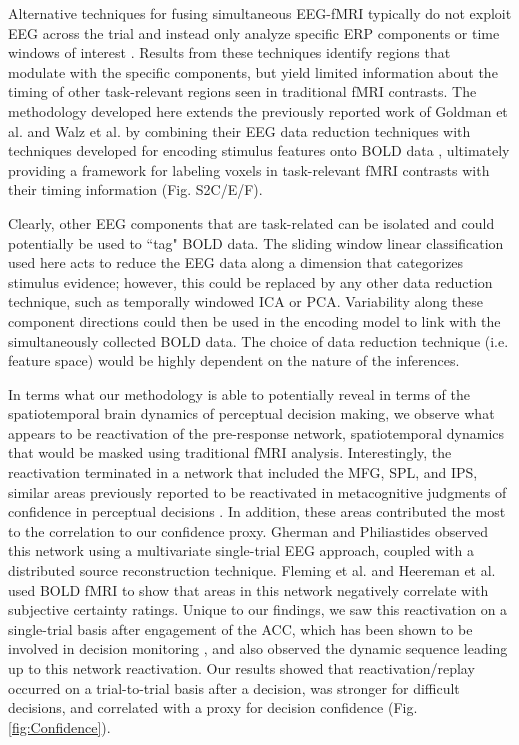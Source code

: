 Alternative techniques for fusing simultaneous EEG-fMRI typically do not exploit EEG across the trial and instead only analyze specific ERP components or time windows of interest \cite{DeMartino2010,Fouragnan2015,Goldman2009,Huster2012,Jann2009,Jaspers-Fayer2012,Mayhew2013,Novitskiy2011,Omata2013,Walz2013,Walz2013a,Warbrick2013a,Warbrick2009}. Results from these techniques identify regions that modulate with the specific components, but yield limited information about the timing of other task-relevant regions seen in traditional fMRI contrasts. The methodology developed here extends the previously reported work of Goldman et al. \cite{Goldman2009} and Walz et al. \cite{Walz2013} by combining their EEG data reduction techniques with techniques developed for encoding stimulus features onto BOLD data \cite{Cukur2013,Hansen2007,Kay2008,Naselaris2011,Nishimoto2011,Stansbury2013}, ultimately providing a framework for labeling voxels in task-relevant fMRI contrasts with their timing information (Fig. S2C/E/F). 

Clearly, other EEG components that are task-related can be isolated and could potentially be used to ``tag" BOLD data. The sliding window linear classification used here acts to reduce the EEG data along a dimension that categorizes stimulus evidence; however, this could be replaced by any other data reduction technique, such as temporally windowed ICA or PCA. Variability along these component directions could then be used in the encoding model to link with the simultaneously collected BOLD data. The choice of data reduction technique (i.e. feature space) would be highly dependent on the nature of the inferences.

In terms what our methodology is able to potentially reveal in terms of the spatiotemporal brain dynamics of perceptual decision making, we observe what appears to be reactivation of the pre-response network, spatiotemporal dynamics that would be masked using traditional fMRI analysis. Interestingly, the reactivation terminated in a network that included the MFG, SPL, and IPS, similar areas previously reported to be reactivated in metacognitive judgments of confidence in perceptual decisions \cite{Fleming2012,Steinhauser2010,Yeung2012}. In addition, these areas contributed the most to the correlation to our confidence proxy. Gherman and Philiastides \cite{Gherman2015} observed this network using a multivariate single-trial EEG approach, coupled with a distributed source reconstruction technique. Fleming et al.\cite{Fleming2012} and Heereman et al. \cite{Heereman2015} used BOLD fMRI to show that areas in this network negatively correlate with subjective certainty ratings.  Unique to our findings, we saw this reactivation on a single-trial basis after engagement of the ACC, which has been shown to be involved in decision monitoring \cite{Botvinick2001,Gherman2015}, and also observed the dynamic sequence leading up to this network reactivation. Our results showed that reactivation/replay occurred on a trial-to-trial basis after a decision, was stronger for difficult decisions, and correlated with a proxy for decision confidence (Fig. \ref{fig:Confidence}).

